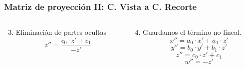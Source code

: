\documentclass[pdf]{beamer}
\begin{document}
\begin{frame}[t]
	\frametitle{Matriz de proyección II: C. Vista a C. Recorte}
	\begin{columns}
		\begin{column}{0.5\textwidth}
			\begin{enumerate}\setcounter{enumi}{2}
				\item Eliminación de partes ocultas
				\begin{equation*}
					z'' = \frac{c_0\cdot z'+c_1}{-z'}
				\end{equation*}
			\end{enumerate}
		\end{column}
		\begin{column}{0.5\textwidth}
		\begin{enumerate}\setcounter{enumi}{3}
		\item Guardamos el término no lineal.
		\begin{equation*}
			x'' = a_0 \cdot x'+a_1 \cdot z'
		\end{equation*}
		\begin{equation*}
			y'' = b_0 \cdot y'+b_1 \cdot z'
		\end{equation*}
		\begin{equation*}
			z'' = c_0\cdot z'+c_1
		\end{equation*}
		\begin{equation*}
			w'' = -z'
		\end{equation*}


\end{enumerate}
\end{column}
\end{columns}
\end{frame}
\end{document}

